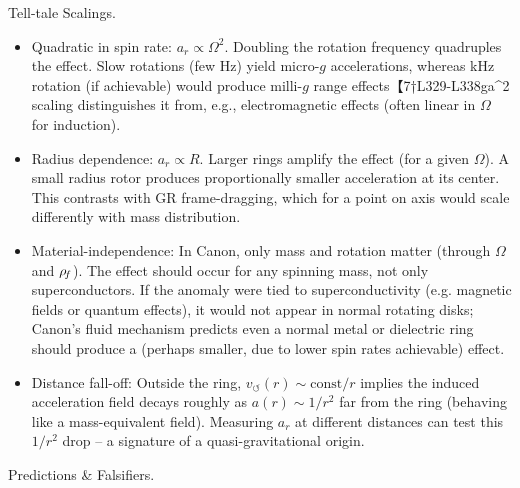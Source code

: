 \documentclass[11pt]{article}
\begin{document}
Tell-tale Scalings.


\begin{itemize}

\item 
Quadratic in spin rate: $a_{r} \propto \Omega^2$. Doubling the rotation frequency quadruples the effect. Slow rotations (few Hz) yield micro-$g$ accelerations, whereas kHz rotation (if achievable) would produce milli-$g$ range effects【7†L329-L338ga^2 scaling distinguishes it from, e.g., electromagnetic effects (often linear in $\Omega$ for induction).




\item 
Radius dependence: $a_{r} \propto R$. Larger rings amplify the effect (for a given $\Omega$). A small radius rotor produces proportionally smaller acceleration at its center. This contrasts with GR frame-dragging, which for a point on axis would scale differently with mass distribution.




\item 
Material-independence: In Canon, only mass and rotation matter (through $\Omega$ and $\rho_{\!f}$). The effect should occur for any spinning mass, not only superconductors. If the anomaly were tied to superconductivity (e.g. magnetic fields or quantum effects), it would not appear in normal rotating disks; Canon’s fluid mechanism predicts even a normal metal or dielectric ring should produce a (perhaps smaller, due to lower spin rates achievable) effect.




\item 
Distance fall-off: Outside the ring, $v_{\circlearrowleft}(r)\sim \text{const}/r$ implies the induced acceleration field decays roughly as $a(r)\sim 1/r^2$ far from the ring (behaving like a mass-equivalent field). Measuring $a_r$ at different distances can test this $1/r^2$ drop – a signature of a quasi-gravitational origin.




\end{itemize}

Predictions \& Falsifiers.
\end{document}
